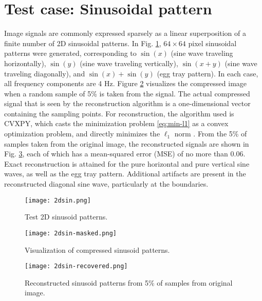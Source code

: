 \section{Test case: Sinusoidal pattern}
\label{sec:2dsin}
Image signals are commonly expressed sparsely as a linear superposition of a finite number of 2D sinusoidal patterns. In Fig. \ref{fig:2dsin}, $64 \times 64$ pixel sinusoidal patterns were generated, corresponding to $\sin(x)$ (sine wave traveling horizontally), $\sin(y)$ (sine wave traveling vertically), $\sin(x+y)$ (sine wave traveling diagonally), and $\sin(x) + \sin(y)$ (egg tray pattern). In each case, all frequency components are 4 Hz. Figure \ref{fig:2dsin-masked} visualizes the compressed image when a random sample of 5\% is taken from the signal. The actual compressed signal that is seen by the reconstruction algorithm is a one-dimensional vector containing the sampling points. For reconstruction, the algorithm used is CVXPY, which casts the minimization problem \ref{eq:min-l1} as a convex optimization problem, and directly minimizes the $\ell_1$ norm \cite{cvxpy,cvxpy_rewriting}. From the 5\% of samples taken from the original image, the reconstructed signals are shown in Fig. \ref{fig:2dsin-recovered}, each of which has a mean-squared error (MSE) of no more than 0.06. Exact reconstruction is attained for the pure horizontal and pure vertical sine waves, as well as the egg tray pattern. Additional artifacts are present in the reconstructed diagonal sine wave, particularly at the boundaries.

\begin{figure}[tb]
	\texttt{[image: 2dsin.png]}
	\caption{Test 2D sinusoid patterns.}
	\label{fig:2dsin}
\end{figure}

\begin{figure}[tb]
	\texttt{[image: 2dsin-masked.png]}
	\caption{Visualization of compressed sinusoid patterns.}
	\label{fig:2dsin-masked}
\end{figure}

\begin{figure}[tb]
	\texttt{[image: 2dsin-recovered.png]}
	\caption{Reconstructed sinusoid patterns from 5\% of samples from original image.}
	\label{fig:2dsin-recovered}
\end{figure}


